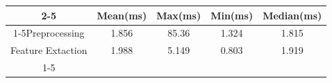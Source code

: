 \documentclass{standalone}
\begin{document}
 
 \begin{tabular}{|c |c |c |c |c |}
\cline{2-5}\cline{2-5} \multicolumn{1}{c |}{ } & Mean(ms) & Max(ms) & Min(ms) & Median(ms)\\ 
\cline{1-5}Preprocessing & 1.856 & 85.36 & 1.324 & 1.815\\ 
 \hhline{|=|=|=|=|=|}Feature Extaction & 1.988 & 5.149 & 0.803 & 1.919\\ 
 \cline{1-5}\hline \end{tabular}
 
\end{document}
